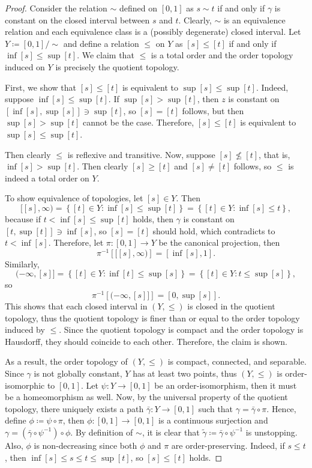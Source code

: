 \documentclass[reqno,centertags,12pt]{amsart}
\theoremstyle{definition}
\numberwithin{equation}{section}
\newcommand{\setbc}[2]{\left\{ #1\colon#2 \right\}}
\begin{document}
\begin{proof}
	Consider the relation $\sim$ defined on $[0,1]$ as $s\sim t$ if and only if
	$\gamma$ is constant on the closed interval between $s$ and $t$. Clearly, $\sim$
	is an equivalence relation and each equivalence class is a (possibly degenerate)
	closed interval. Let $Y\coloneqq[0,1]/\sim$ and define a relation $\leq$ on $Y$ as
	$[s]\leq [t]$ if and only if $\inf[s]\leq\sup[t]$.
	We claim that $\leq$ is a total order and the order topology
	induced on $Y$ is precisely the quotient topology.

	First, we show that $[s]\leq[t]$ is equivalent to $\sup[s]\leq\sup[t]$.
	Indeed, suppose $\inf[s]\leq\sup[t]$. If $\sup[s]>\sup[t]$, then
	$z$ is constant on $\left[\inf[s],\sup[s]\right]\owns\sup[t]$, so
	$[s]=[t]$ follows, but then $\sup[s]>\sup[t]$ cannot be the case.
	Therefore, $[s]\leq[t]$ is equivalent to $\sup[s]\leq\sup[t]$.

	Then clearly $\leq$ is reflexive and transitive. Now, suppose
	$[s]\not\leq[t]$, that is, $\inf[s]>\sup[t]$. Then clearly $[s]\geq [t]$
	and $[s]\neq[t]$ follows, so $\leq$ is indeed a total order on $Y$.

	To show equivalence of topologies, let $[s]\in Y$. Then
	\[
		[[s],\infty) = \setbc{[t]\in Y}{\inf[s]\leq\sup[t]}
		= \setbc{[t]\in Y}{\inf[s]\leq t},
	\]
	because if $t<\inf[s]\leq\sup[t]$ holds, then $\gamma$ is constant on
	$[t,\sup[t]]\owns\inf[s]$, so $[s]=[t]$ should hold, which contradicts to
	$t<\inf[s]$. Therefore, let $\pi\colon [0,1]\to Y$ be the canonical projection, then
	\[
		\pi^{-1}\left[[[s],\infty)\right]=[\inf[s],1].
	\]
	Similarly,
	\[
		(-\infty,[s]] = \setbc{[t]\in Y}{\inf[t]\leq\sup[s]}
		= \setbc{[t]\in Y}{t\leq\sup[s]},
	\]
	so
	\[
		\pi^{-1}\left[(-\infty,[s]]\right]=[0,\sup[s]].
	\]
	This shows that each closed interval in $(Y,\leq)$ is closed in the quotient topology,
	thus the quotient topology is finer than or equal to the order topology
	induced by $\leq$. Since the quotient topology is compact and
	the order topology is Hausdorff, they should coincide to each other.
	Therefore, the claim is shown.

	As a result, the order topology of $(Y,\leq)$ is compact, connected, and separable.
	Since $\gamma$ is not globally constant, $Y$ has at least two points, thus
	$(Y,\leq)$ is order-isomorphic to $[0,1]$. Let $\psi\colon Y\to [0,1]$
	be an order-isomorphism, then it must be a homeomorphism as well.
	Now, by the universal property of the quotient topology, there uniquely exists a path
    $\bar{\gamma}\colon Y\to[0,1]$ such that $\gamma = \bar{\gamma}\circ\pi$. Hence, define
    $\phi\coloneqq\psi\circ\pi$, then $\phi\colon[0,1]\to[0,1]$ is a continuous surjection
	and $\gamma = (\bar{\gamma}\circ\psi^{-1})\circ\phi$. By definition of $\sim$,
    it is clear that $\tilde{\gamma}\coloneqq\bar{\gamma}\circ\psi^{-1}$ is unstopping.
	Also, $\phi$ is non-decreasing since both $\phi$ and $\pi$ are order-preserving.
	Indeed, if $s\leq t$, then $\inf[s]\leq s\leq t\leq \sup[t]$, so $[s]\leq [t]$ holds.
\end{proof}
\end{document}
